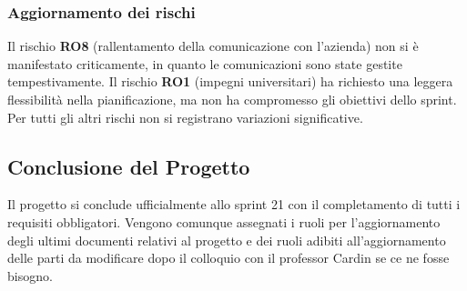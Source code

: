 \subsubsection{Aggiornamento dei rischi}
Il rischio \textbf{RO8} (rallentamento della comunicazione con l'azienda) non si è manifestato criticamente, in quanto le comunicazioni sono state gestite tempestivamente. Il rischio \textbf{RO1} (impegni universitari) ha richiesto una leggera flessibilità nella pianificazione, ma non ha compromesso gli obiettivi dello sprint. Per tutti gli altri rischi non si registrano variazioni significative.

\subsection{Conclusione del Progetto}
Il progetto si conclude ufficialmente allo sprint 21 con il completamento di tutti i requisiti obbligatori.
Vengono comunque assegnati i ruoli per l'aggiornamento degli ultimi documenti relativi al progetto e dei ruoli 
adibiti all'aggiornamento delle parti da modificare dopo il colloquio con il professor Cardin se ce ne fosse bisogno.